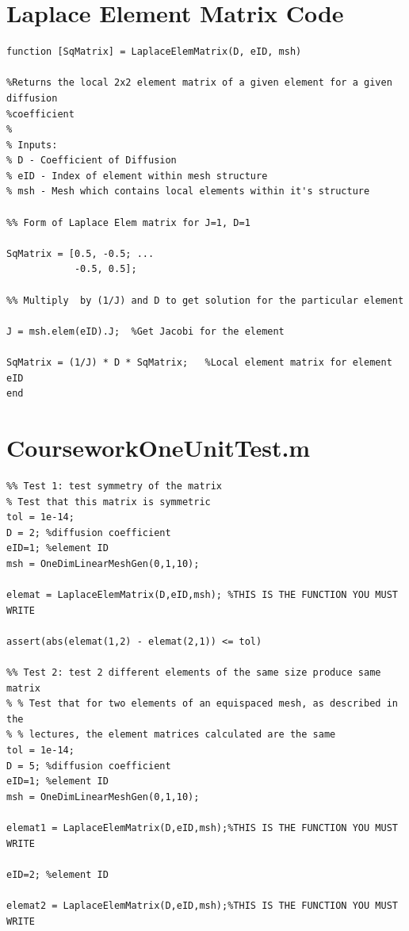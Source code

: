 \documentclass[11pt]{article}
\begin{document}
\begin{appendices}
\section{Laplace Element Matrix Code}\label{ap:LaplaceElem}
\begin{lstlisting}
function [SqMatrix] = LaplaceElemMatrix(D, eID, msh)

%Returns the local 2x2 element matrix of a given element for a given diffusion
%coefficient
%
% Inputs: 
% D - Coefficient of Diffusion
% eID - Index of element within mesh structure
% msh - Mesh which contains local elements within it's structure

%% Form of Laplace Elem matrix for J=1, D=1

SqMatrix = [0.5, -0.5; ...
            -0.5, 0.5];

%% Multiply  by (1/J) and D to get solution for the particular element

J = msh.elem(eID).J;  %Get Jacobi for the element

SqMatrix = (1/J) * D * SqMatrix;   %Local element matrix for element eID
end
\end{lstlisting}
\pagebreak

\section{CourseworkOneUnitTest.m}
\label{ap:CW1}
\begin{lstlisting}
%% Test 1: test symmetry of the matrix
% Test that this matrix is symmetric
tol = 1e-14;
D = 2; %diffusion coefficient
eID=1; %element ID
msh = OneDimLinearMeshGen(0,1,10);

elemat = LaplaceElemMatrix(D,eID,msh); %THIS IS THE FUNCTION YOU MUST WRITE

assert(abs(elemat(1,2) - elemat(2,1)) <= tol)

%% Test 2: test 2 different elements of the same size produce same matrix
% % Test that for two elements of an equispaced mesh, as described in the
% % lectures, the element matrices calculated are the same
tol = 1e-14;
D = 5; %diffusion coefficient
eID=1; %element ID
msh = OneDimLinearMeshGen(0,1,10);

elemat1 = LaplaceElemMatrix(D,eID,msh);%THIS IS THE FUNCTION YOU MUST WRITE

eID=2; %element ID

elemat2 = LaplaceElemMatrix(D,eID,msh);%THIS IS THE FUNCTION YOU MUST WRITE


\end{lstlisting}
\end{appendices}
\end{document}
